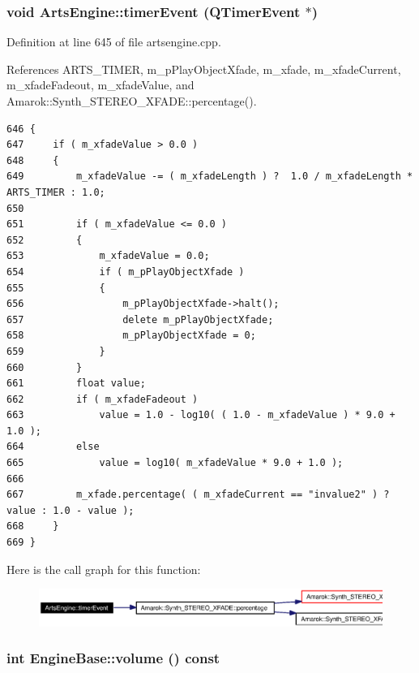 \subsubsection{\setlength{\rightskip}{0pt plus 5cm}void Arts\-Engine::timer\-Event (QTimer\-Event $\ast$)\hspace{0.3cm}{\tt  [private]}}\label{classArtsEngine_ArtsEngined1}




Definition at line 645 of file artsengine.cpp.

References ARTS\_\-TIMER, m\_\-p\-Play\-Object\-Xfade, m\_\-xfade, m\_\-xfade\-Current, m\_\-xfade\-Fadeout, m\_\-xfade\-Value, and Amarok::Synth\_\-STEREO\_\-XFADE::percentage().



\footnotesize\begin{verbatim}646 {
647     if ( m_xfadeValue > 0.0 )
648     {
649         m_xfadeValue -= ( m_xfadeLength ) ?  1.0 / m_xfadeLength * ARTS_TIMER : 1.0;
650 
651         if ( m_xfadeValue <= 0.0 )
652         {
653             m_xfadeValue = 0.0;
654             if ( m_pPlayObjectXfade )
655             {
656                 m_pPlayObjectXfade->halt();
657                 delete m_pPlayObjectXfade;
658                 m_pPlayObjectXfade = 0;
659             }
660         }
661         float value;
662         if ( m_xfadeFadeout )
663             value = 1.0 - log10( ( 1.0 - m_xfadeValue ) * 9.0 + 1.0 );
664         else
665             value = log10( m_xfadeValue * 9.0 + 1.0 );
666 
667         m_xfade.percentage( ( m_xfadeCurrent == "invalue2" ) ? value : 1.0 - value );
668     }
669 }
\end{verbatim}\normalsize 


Here is the call graph for this function:\begin{figure}[H]
\begin{center}
\leavevmode
\includegraphics[width=353pt]{classArtsEngine_ArtsEngined1_cgraph}
\end{center}
\end{figure}
\subsubsection{\setlength{\rightskip}{0pt plus 5cm}int Engine\-Base::volume () const\hspace{0.3cm}{\tt  [inline, inherited]}}\label{classEngineBase_EngineBasea10}


